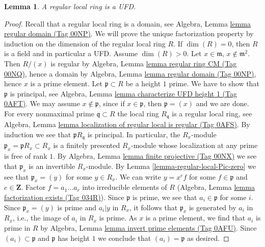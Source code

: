 \documentclass{amsart}
\theoremstyle{plain}
\newtheorem{lemma}[subsection]{Lemma}
\theoremstyle{definition}
\theoremstyle{remark}
\numberwithin{equation}{subsection}
\begin{document}
\begin{lemma}
\label{lemma-regular-local-UFD}
A regular local ring is a UFD.
\end{lemma}

\begin{proof}
Recall that a regular local ring is a domain, see
Algebra, Lemma \href{https://stacks.math.columbia.edu/tag/00NP}{lemma regular domain (Tag 00NP)}.
We will prove the unique factorization property
by induction on the dimension of the regular local ring $R$.
If $\dim(R) = 0$, then $R$ is a field and in particular a UFD.
Assume $\dim(R) > 0$. Let $x \in \mathfrak m$, $x \not \in \mathfrak m^2$.
Then $R/(x)$ is regular by Algebra, Lemma \href{https://stacks.math.columbia.edu/tag/00NQ}{lemma regular ring CM (Tag 00NQ)},
hence a domain by
Algebra, Lemma \href{https://stacks.math.columbia.edu/tag/00NP}{lemma regular domain (Tag 00NP)},
hence $x$ is a prime element.
Let $\mathfrak p \subset R$ be a height $1$ prime. We have
to show that $\mathfrak p$ is principal, see
Algebra, Lemma \href{https://stacks.math.columbia.edu/tag/0AFT}{lemma characterize UFD height 1 (Tag 0AFT)}.
We may assume $x \not \in \mathfrak p$, since if $x \in \mathfrak p$,
then $\mathfrak p = (x)$ and we are done.
For every nonmaximal prime $\mathfrak q \subset R$
the local ring $R_\mathfrak q$ is a regular local ring, see
Algebra, Lemma \href{https://stacks.math.columbia.edu/tag/0AFS}{lemma localization of regular local is regular (Tag 0AFS)}.
By induction we see that $\mathfrak pR_\mathfrak q$ is principal.
In particular, the $R_x$-module $\mathfrak p_x = \mathfrak pR_x \subset R_x$
is a finitely presented $R_x$-module whose localization at
any prime is free of rank $1$. 
By Algebra, Lemma \href{https://stacks.math.columbia.edu/tag/00NX}{lemma finite projective (Tag 00NX)}
we see that $\mathfrak p_x$ is an invertible $R_x$-module.
By Lemma \ref{lemma-regular-local-Pic-zero} we see that
$\mathfrak p_x = (y)$ for some $y \in R_x$.
We can write $y = x^e f$ for some $f \in \mathfrak p$ and $e \in \mathbf{Z}$.
Factor $f = a_1 \ldots a_r$ into irreducible elements of $R$
(Algebra, Lemma \href{https://stacks.math.columbia.edu/tag/034R}{lemma factorization exists (Tag 034R)}).
Since $\mathfrak p$ is prime, we see that $a_i \in \mathfrak p$
for some $i$. Since $\mathfrak p_x = (y)$ is prime and
$a_i | y$ in $R_x$, it follows that $\mathfrak p_x$ is generated by
$a_i$ in $R_x$, i.e., the image of $a_i$ in $R_x$ is prime.
As $x$ is a prime element, we find that $a_i$ is prime in $R$ by
Algebra, Lemma \href{https://stacks.math.columbia.edu/tag/0AFU}{lemma invert prime elements (Tag 0AFU)}.
Since $(a_i) \subset \mathfrak p$ and $\mathfrak p$ has height
$1$ we conclude that $(a_i) = \mathfrak p$ as desired.
\end{proof}
\end{document}
